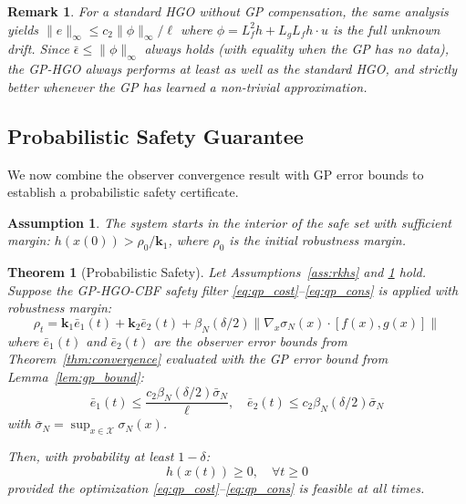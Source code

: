 \documentclass[letterpaper, 10 pt, conference]{ieeeconf}
\newtheorem{theorem}{Theorem}
\newtheorem{assumption}{Assumption}
\newtheorem{remark}{Remark}
\begin{document}
\begin{remark}
For a standard HGO without GP compensation, the same analysis yields $\|e\|_\infty \leq c_2 \|\phi\|_\infty / \ell$ where $\phi = L_f^2 h + L_g L_f h \cdot u$ is the \emph{full} unknown drift. Since $\bar{\epsilon} \leq \|\phi\|_\infty$ always holds (with equality when the GP has no data), the GP-HGO always performs at least as well as the standard HGO, and strictly better whenever the GP has learned a non-trivial approximation.
\end{remark}

\subsection{Probabilistic Safety Guarantee}

We now combine the observer convergence result with GP error bounds to establish a probabilistic safety certificate.

\begin{assumption}\label{ass:initial_safety}
The system starts in the interior of the safe set with sufficient margin: $h(x(0)) > \rho_0 / \bm{k}_1$, where $\rho_0$ is the initial robustness margin.
\end{assumption}

\begin{theorem}[Probabilistic Safety]\label{thm:safety}
Let Assumptions~\ref{ass:rkhs} and \ref{ass:initial_safety} hold. Suppose the GP-HGO-CBF safety filter \eqref{eq:qp_cost}--\eqref{eq:qp_cons} is applied with robustness margin:
\begin{equation}\label{eq:margin}
    \rho_t = \bm{k}_1 \bar{e}_1(t) + \bm{k}_2 \bar{e}_2(t) + \beta_N(\delta/2) \left\| \nabla_x \sigma_N(x) \cdot [f(x), g(x)] \right\|
\end{equation}
where $\bar{e}_1(t)$ and $\bar{e}_2(t)$ are the observer error bounds from Theorem~\ref{thm:convergence} evaluated with the GP error bound from Lemma~\ref{lem:gp_bound}:
\begin{equation}
    \bar{e}_1(t) \leq \frac{c_2 \beta_N(\delta/2) \bar{\sigma}_N}{\ell}, \quad \bar{e}_2(t) \leq c_2 \beta_N(\delta/2) \bar{\sigma}_N
\end{equation}
with $\bar{\sigma}_N = \sup_{x \in \mathcal{X}} \sigma_N(x)$.

Then, with probability at least $1 - \delta$:
\begin{equation}
    h(x(t)) \geq 0, \quad \forall t \geq 0
\end{equation}
provided the optimization \eqref{eq:qp_cost}--\eqref{eq:qp_cons} is feasible at all times.
\end{theorem}
\end{document}
